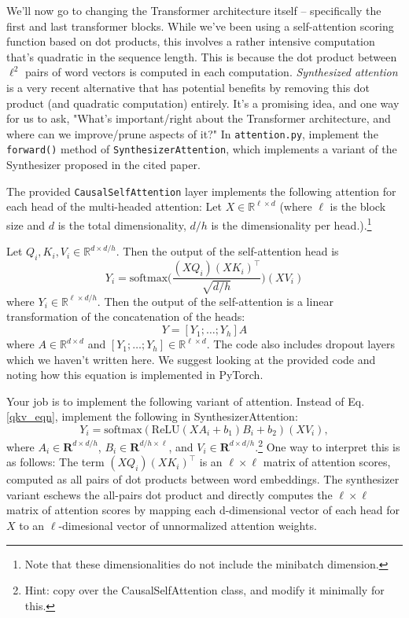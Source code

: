 \documentclass[letterpaper,12pt]{article}
\begin{document}
\begin{itemize}
		We'll now go to changing the Transformer architecture itself -- specifically the first and last transformer blocks.
		While we've been using a self-attention scoring function based on dot products, this involves a rather intensive computation that's quadratic in the sequence length. This is because the dot product between $\ell^2$ pairs of word vectors is computed in each computation. \textit{Synthesized attention} \cite{b3} is a very recent alternative that has potential benefits by removing this dot product (and quadratic computation) entirely. It's a promising idea, and one way for us to ask, "What's important/right about the Transformer architecture, and where can we improve/prune aspects of it?" In \texttt{attention.py}, implement the \texttt{forward()} method of \texttt{SynthesizerAttention}, which implements a variant of the Synthesizer proposed in the cited paper.
		
		The provided \texttt{CausalSelfAttention} layer implements the following attention for each head of the multi-headed attention: Let $X\in \mathbb{R}^{\ell \times d}$ (where $\ell$ is the block size and $d$ is the total dimensionality, $d/h$ is the dimensionality per head.).\footnote{Note that these dimensionalities do not include the minibatch dimension.}
		
		Let $Q_i,K_i,V_i \in \mathbb{R}^{d\times d/h}$.
		Then the output of the self-attention head is 
		\begin{equation} \label{qkv_eqn}
			Y_i = \text{softmax}\bigg(\frac{(XQ_i)(XK_i)^\top}{\sqrt{d/h}}\bigg)(XV_i)
		\end{equation}
		where $Y_i\in\mathbb{R}^{\ell \times d/h}$.
		Then the output of the self-attention is a linear transformation of the concatenation of the heads:
		\begin{equation}
			Y = [Y_1;\dots;Y_h]A
		\end{equation}
		where $A \in\mathbb{R}^{d\times d}$ and $[Y_1;\dots;Y_h]\in\mathbb{R}^{\ell \times d}$.
		The code also includes dropout layers which we haven't written here.
		We suggest looking at the provided code and noting how this equation is implemented in PyTorch.

		Your job is to implement the following variant of attention. Instead of Eq. \ref{qkv_eqn}, implement the
		following in SynthesizerAttention:
		\begin{equation}
			Y_i = \text{softmax}\left( \text{ReLU}(XA_i + b_1)B_i + b_2 \right)\left(XV_i\right),
		\end{equation}
		where $A_i \in \mathbf{R}^{d\times d/h}$, $B_i \in \mathbf{R}^{d/h \times \ell}$, and $V_i \in \mathbf{R}^{d \times d/h}$.\footnote{Hint: copy over the CausalSelfAttention class, and modify it minimally for this.} One way to interpret this is as follows: The term $(XQ_i)(XK_i)^\top$ is an $\ell \times \ell$ matrix of attention scores, computed as all pairs of dot products between word embeddings. The synthesizer variant eschews the all-pairs dot product and directly computes the $\ell \times \ell$ matrix of attention scores by mapping each d-dimensional vector of each head for $X$ to an $\ell$-dimesional vector of unnormalized attention weights.
		

\end{itemize}
\end{document}
